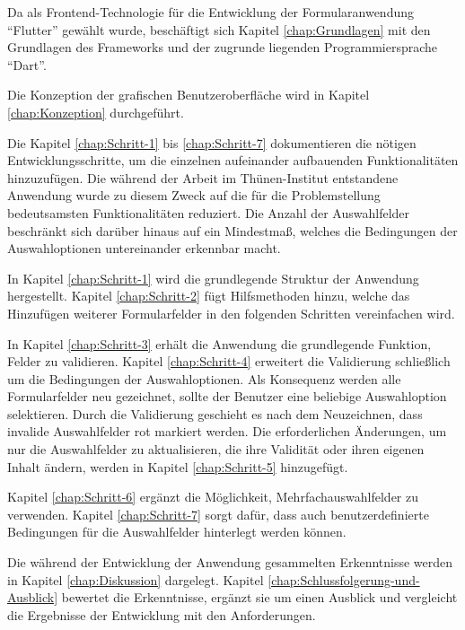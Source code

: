 Da als Frontend-Technologie für die Entwicklung der Formularanwendung \enquote{Flutter} gewählt wurde,
beschäftigt sich Kapitel \ref{chap:Grundlagen} mit den Grundlagen des Frameworks und der zugrunde liegenden Programmiersprache \enquote{Dart}.

Die Konzeption der grafischen Benutzeroberfläche wird in Kapitel \ref{chap:Konzeption} durchgeführt.

Die Kapitel \ref{chap:Schritt-1} bis \ref{chap:Schritt-7} dokumentieren die nötigen Entwicklungsschritte,
um die einzelnen aufeinander aufbauenden  Funktionalitäten hinzuzufügen.
Die während der Arbeit im Thünen-Institut entstandene Anwendung wurde zu diesem Zweck auf die für die  Problemstellung bedeutsamsten Funktionalitäten reduziert.
Die Anzahl der Auswahlfelder beschränkt sich darüber hinaus auf ein Mindestmaß,
welches die Bedingungen der Auswahloptionen untereinander erkennbar macht. 

In Kapitel \ref{chap:Schritt-1} wird die grundlegende Struktur der Anwendung hergestellt.
Kapitel \ref{chap:Schritt-2} fügt Hilfsmethoden hinzu,
welche  das Hinzufügen  weiterer Formularfelder  in den folgenden Schritten vereinfachen wird.

In Kapitel \ref{chap:Schritt-3} erhält die Anwendung die grundlegende Funktion,
Felder zu validieren.
Kapitel \ref{chap:Schritt-4} erweitert die Validierung schließlich um die Bedingungen der Auswahloptionen.
Als Konsequenz werden alle Formularfelder neu gezeichnet,
sollte  der Benutzer eine beliebige Auswahloption selektieren.
Durch die Validierung  geschieht es nach dem Neuzeichnen,
dass invalide Auswahlfelder rot markiert werden.
Die erforderlichen Änderungen,
um nur die Auswahlfelder zu aktualisieren,
die ihre Validität oder ihren eigenen Inhalt ändern,
werden in Kapitel \ref{chap:Schritt-5} hinzugefügt.

Kapitel \ref{chap:Schritt-6} ergänzt die Möglichkeit,
Mehrfachauswahlfelder zu verwenden.
Kapitel \ref{chap:Schritt-7} sorgt dafür,
dass auch benutzerdefinierte Bedingungen für die Auswahlfelder hinterlegt werden können.

Die während der Entwicklung der Anwendung gesammelten Erkenntnisse werden in Kapitel \ref{chap:Diskussion} dargelegt.
Kapitel \ref{chap:Schlussfolgerung-und-Ausblick} bewertet die Erkenntnisse,
ergänzt sie um einen Ausblick und vergleicht die Ergebnisse der Entwicklung mit den Anforderungen.
